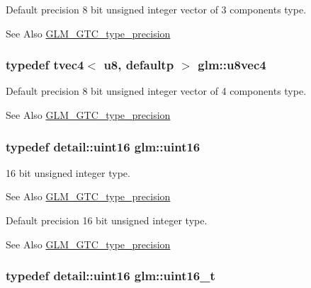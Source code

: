 Default precision 8 bit unsigned integer vector of 3 components type. \begin{DoxySeeAlso}{See Also}
\hyperlink{group__gtc__type__precision}{G\-L\-M\-\_\-\-G\-T\-C\-\_\-type\-\_\-precision} 
\end{DoxySeeAlso}
\hypertarget{group__gtc__type__precision_gaf3c840b8a90a194559121504ba599197}{
\subsubsection[{u8vec4}]{\setlength{\rightskip}{0pt plus 5cm}typedef tvec4$<$ u8, defaultp $>$ {\bf glm\-::u8vec4}}}\label{group__gtc__type__precision_gaf3c840b8a90a194559121504ba599197}
Default precision 8 bit unsigned integer vector of 4 components type. \begin{DoxySeeAlso}{See Also}
\hyperlink{group__gtc__type__precision}{G\-L\-M\-\_\-\-G\-T\-C\-\_\-type\-\_\-precision} 
\end{DoxySeeAlso}
\hypertarget{group__gtc__type__precision_gad8c2939e1fdd8e5828b31d95c52255d5}{
\subsubsection[{uint16}]{\setlength{\rightskip}{0pt plus 5cm}typedef detail\-::uint16 {\bf glm\-::uint16}}}\label{group__gtc__type__precision_gad8c2939e1fdd8e5828b31d95c52255d5}
16 bit unsigned integer type. \begin{DoxySeeAlso}{See Also}
\hyperlink{group__gtc__type__precision}{G\-L\-M\-\_\-\-G\-T\-C\-\_\-type\-\_\-precision}
\end{DoxySeeAlso}
Default precision 16 bit unsigned integer type. \begin{DoxySeeAlso}{See Also}
\hyperlink{group__gtc__type__precision}{G\-L\-M\-\_\-\-G\-T\-C\-\_\-type\-\_\-precision} 
\end{DoxySeeAlso}
\hypertarget{group__gtc__type__precision_gac4eb4f43cae8129b00086dc234d3b8fc}{
\subsubsection[{uint16\-\_\-t}]{\setlength{\rightskip}{0pt plus 5cm}typedef detail\-::uint16 {\bf glm\-::uint16\-\_\-t}}}\label{group__gtc__type__precision_gac4eb4f43cae8129b00086dc234d3b8fc}

